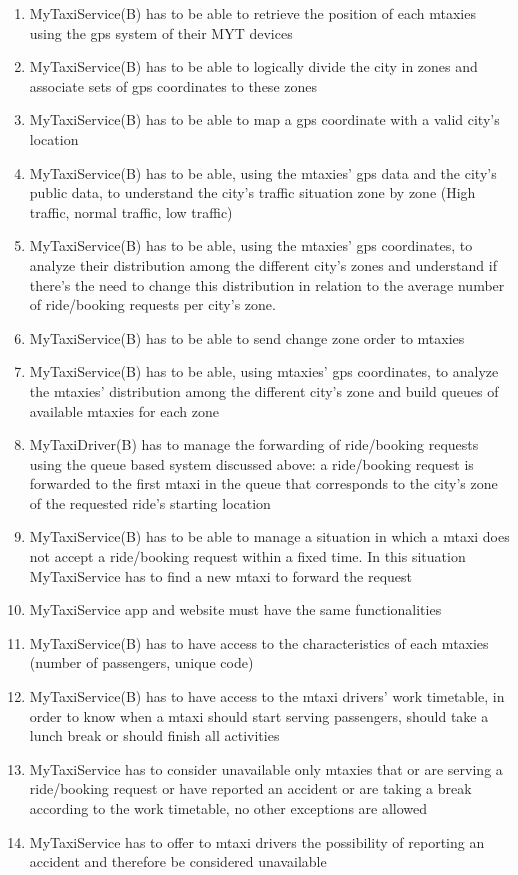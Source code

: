 \documentclass[11pt,titlepage]{article} %
\begin{document}
\begin{enumerate}
	      \item MyTaxiService(B) has to be able to retrieve the position of each mtaxies using the gps system of their MYT devices
	      \item MyTaxiService(B) has to be able to logically divide the city in zones and associate sets of gps
	      coordinates to these zones
	      \item MyTaxiService(B) has to be able to map a gps coordinate with a valid city's location
	      \item MyTaxiService(B) has to be able, using the mtaxies' gps data and the city's public data, to understand the
	      city's traffic situation zone by zone (High traffic, normal traffic, low traffic)
	      \item MyTaxiService(B) has to be able, using the mtaxies' gps coordinates, to analyze their
	      distribution among the different city's zones and understand if there's the need to change this
	      distribution in relation to the average number of ride/booking requests per city's zone.
	      \item MyTaxiService(B) has to be able to send change zone order to mtaxies
	      \item MyTaxiService(B) has to be able, using mtaxies' gps coordinates, to analyze the mtaxies'
	      distribution among the different city's zone and build queues of available mtaxies for each zone
	      \item MyTaxiDriver(B) has to manage the forwarding of ride/booking requests using the queue based system discussed above:
	      a ride/booking request is forwarded to the first mtaxi in the queue that corresponds to the city's zone of the requested ride's
	      starting location
	      \item MyTaxiService(B) has to be able to manage a situation in which a mtaxi does not accept a ride/booking request within a fixed time.
	      In this situation MyTaxiService has to find a new mtaxi to forward the request
	      \item MyTaxiService app and website must have the same functionalities
	      \item MyTaxiService(B) has to have access to the characteristics of each mtaxies (number of passengers, unique code)
	      \item MyTaxiService(B) has to have access to the mtaxi drivers' work timetable, in order to know when a mtaxi should start
	      serving passengers, should take a lunch break or should finish all activities
	      \item MyTaxiService has to consider unavailable only mtaxies that or are serving a ride/booking request or have reported an accident or
	      are taking a break according to the work timetable, no other exceptions are allowed
	      \item MyTaxiService has to offer to mtaxi drivers the possibility of reporting an accident and therefore be considered unavailable
	\end{enumerate}
\end{document}
